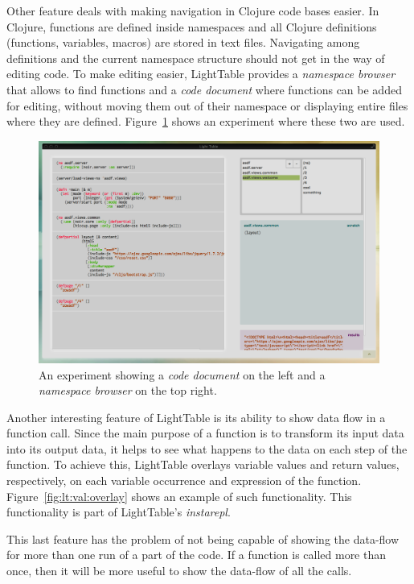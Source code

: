 Other feature deals with making navigation in Clojure code bases easier.
In Clojure, functions are defined inside namespaces and all Clojure definitions (functions, variables, macros) are stored in text files.
Navigating among definitions and the current namespace structure should not get in the way of editing code.
To make editing easier, LightTable provides a \emph{namespace browser} that allows to find functions and a \emph{code document} where functions can be added for editing, without moving them out of their namespace or displaying entire files where they are defined.
Figure~\ref{fig:lt:clojure:table} shows an experiment where these two are used.

\begin{figure}
  \centering
  \includegraphics[width=12cm]{./images/lt_clojure_table__inv}
  \caption{An experiment showing a \emph{code document} on the left and a \emph{namespace browser} on the top right.}
  \label{fig:lt:clojure:table}
\end{figure}

Another interesting feature of LightTable is its ability to show data flow in a function call.
Since the main purpose of a function is to transform its input data into its output data, it helps to see what happens to the data on each step of the function.
To achieve this, LightTable overlays variable values and return values, respectively, on each variable occurrence and expression of the function.
Figure~\ref{fig:lt:val:overlay} shows an example of such functionality.
This functionality is part of LightTable's \emph{instarepl}.

This last feature has the problem of not being capable of showing the data-flow for more than one run of a part of the code.
If a function is called more than once, then it will be more useful to show the data-flow of all the calls.

